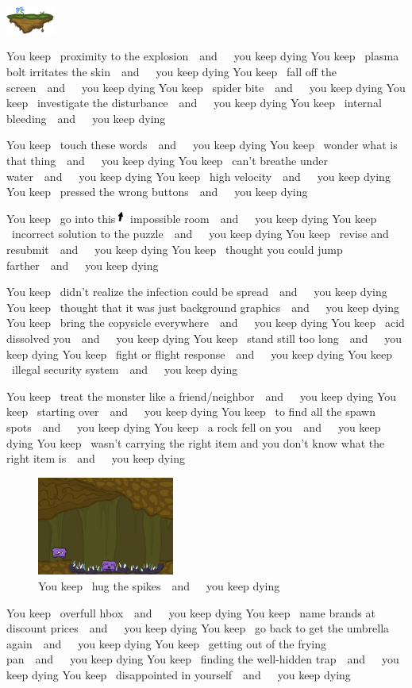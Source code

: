 \documentclass[twocolumn]{article}
\newcommand\ykd[1]{You keep ~{#1}~~and~~~you keep dying\qquad}
\begin{document}
\vspace{0.55in}
\qquad\qquad\qquad\includegraphics[width=0.12\textwidth]{platform}

\ykd{proximity to the explosion}
\ykd{plasma bolt irritates the skin}
\ykd{fall off the screen}
\ykd{spider bite}
\ykd{investigate the disturbance}
\ykd{internal bleeding}

\vspace{0.8in}
\ykd{touch these words}
\ykd{wonder what is that thing}
\ykd{can't breathe under water}
\ykd{high velocity}
\ykd{pressed the wrong buttons}

\vspace{0.7in}
\ykd{go into this\includegraphics[width=1em]{uparrow} impossible room}
\ykd{incorrect solution to the puzzle}
\ykd{revise and resubmit}
\ykd{thought you could jump farther}

\ykd{didn't realize the infection could be spread}
\ykd{thought that it was just background graphics}
\ykd{bring the copysicle everywhere}
\ykd{acid dissolved you}
\ykd{stand still too long}
\ykd{fight or flight response}
\ykd{illegal security system}

\vspace{0.7in}
\ykd{treat the monster like a friend/neighbor}
\ykd{starting over}
\ykd{to find all the spawn spots}
\ykd{a rock fell on you}
\ykd{wasn't carrying the right item and you don't know what the right item is}

\begin{figure}[t!]
\begin{center}
\includegraphics[width=0.40\textwidth]{spikes}
\end{center}
\caption{\tiny \ykd{hug the spikes}} \label{fig:spikes}
\end{figure}

\ykd{overfull hbox}
\ykd{name brands at discount prices}
\ykd{go back to get the umbrella again}
\ykd{getting out of the frying pan}
\ykd{finding the well-hidden trap}
\ykd{disappointed in yourself}
\end{document}
